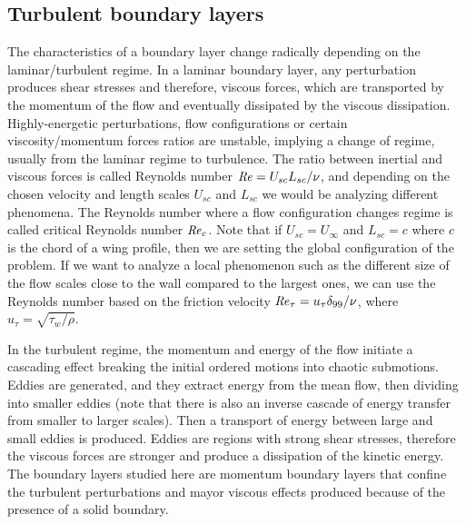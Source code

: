 \subsection{Turbulent boundary layers}
The characteristics of a boundary layer change radically depending on the laminar/turbulent regime.
In a laminar boundary layer, any perturbation produces shear stresses and therefore, viscous forces, which are transported by the momentum of the flow and eventually dissipated by the viscous dissipation. 
Highly-energetic perturbations, flow configurations or certain viscosity/momentum forces ratios are unstable, implying a change of regime, usually from the laminar regime to turbulence. 
The ratio between inertial and viscous forces is called Reynolds number $\mbox{\textit{Re}}=U_{sc} L_{sc} / \nu$, and depending on the chosen velocity and length scales $U_{sc}$ and $L_{sc}$ we would be analyzing different phenomena. The Reynolds number where a flow configuration changes regime is called critical Reynolds number $\mbox{\textit{Re}}_c$.
Note that if $U_{sc}=U_{\infty}$ and $L_{sc}=c$ where $c$ is the chord of a wing profile, then we are setting the global configuration of the problem. If we want to analyze a local phenomenon such as the different size of the flow scales close to the wall compared to the largest ones, we can use the Reynolds number based on the friction velocity $\mbox{\textit{Re}}_{\tau}=u_{\tau}\delta_{99}/\nu$, where  $u_{\tau}=\sqrt{\tau_w / \rho}$.

In the turbulent regime, the momentum and energy of the flow initiate a cascading effect breaking the initial ordered motions into chaotic submotions. 
Eddies are generated, and they extract energy from the mean flow, then dividing into smaller eddies (note that there is also an inverse cascade of energy transfer from smaller to larger scales). Then a transport of energy between large and small eddies is produced. Eddies are regions with strong shear stresses, therefore the viscous forces are stronger and produce a dissipation of the kinetic energy.
The boundary layers studied here are momentum boundary layers that confine the turbulent perturbations and mayor viscous effects produced because of the presence of a solid boundary.

